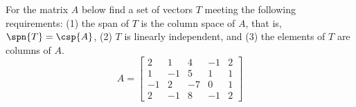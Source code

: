 For the matrix $A$ below find a set of vectors $T$ meeting the following requirements:  (1) the span of $T$ is the column space of $A$, that is, $\spn{T}=\csp{A}$, (2) $T$ is linearly independent, and (3) the elements of $T$ are columns of $A$.
%
\begin{equation*}
A=
\begin{bmatrix}
 2 & 1 & 4 & -1 & 2 \\
 1 & -1 & 5 & 1 & 1 \\
 -1 & 2 & -7 & 0 & 1 \\
 2 & -1 & 8 & -1 & 2
\end{bmatrix}
\end{equation*}